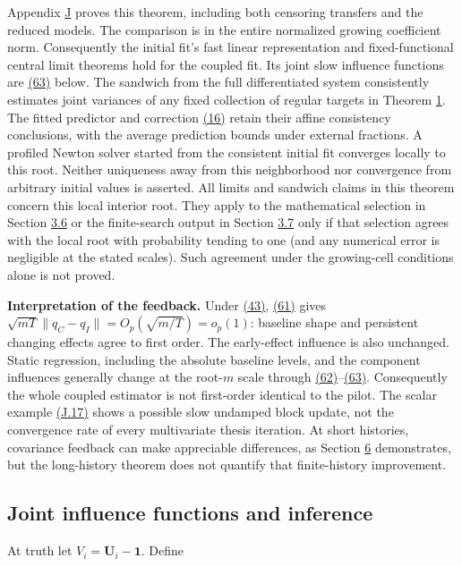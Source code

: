 \documentclass[11pt]{article}
\begin{document}
Appendix \hyperref[sec:J]{J} proves this theorem, including both censoring transfers and the reduced models. The comparison is in the entire normalized growing coefficient norm. Consequently the initial fit's fast linear representation and fixed-functional central limit theorems hold for the coupled fit. Its joint slow influence functions are \hyperref[eq:63]{(63)} below. The sandwich from the full differentiated system consistently estimates joint variances of any fixed collection of regular targets in Theorem \hyperref[res:Theorem-1]{1}. The fitted predictor and correction \hyperref[eq:16]{(16)} retain their affine consistency conclusions, with the average prediction bounds under external fractions. A profiled Newton solver started from the consistent initial fit converges locally to this root. Neither uniqueness away from this neighborhood nor convergence from arbitrary initial values is asserted. All limits and sandwich claims in this theorem concern this local interior root. They apply to the mathematical selection in Section \hyperref[sec:3.6]{3.6} or the finite-search output in Section \hyperref[sec:3.7]{3.7} only if that selection agrees with the local root with probability tending to one (and any numerical error is negligible at the stated scales). Such agreement under the growing-cell conditions alone is not proved.

\textbf{Interpretation of the feedback.} Under \hyperref[eq:43]{(43)}, \hyperref[eq:61]{(61)} gives
\(\sqrt{mT}\|q_C-q_I\|=O_p(\sqrt{m/T})=o_p(1)\): baseline shape and persistent changing effects agree to first order. The early-effect influence is also unchanged. Static regression, including the absolute baseline levels, and the component influences generally change at the root-\(m\) scale through \hyperref[eq:62]{(62)}--\hyperref[eq:63]{(63)}. Consequently the whole coupled estimator is not first-order identical to the pilot. The scalar example \hyperref[eq:J.17]{(J.17)} shows a possible slow undamped block update, not the convergence rate of every multivariate thesis iteration. At short histories, covariance feedback can make appreciable differences, as Section \hyperref[sec:6]{6} demonstrates, but the long-history theorem does not quantify that finite-history improvement.

\subsection{Joint influence functions and inference}\label{sec:4.7}

At truth let \(V_i=\mathbf U_i-\mathbf1\). Define
\end{document}
